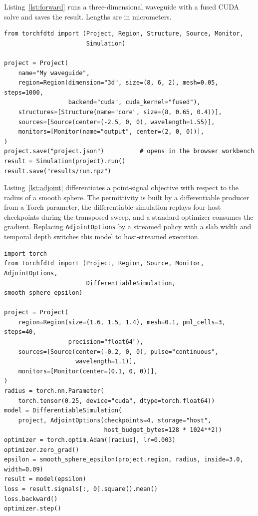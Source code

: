 \documentclass[11pt,a4paper]{article}
\newcommand{\code}[1]{{\small\nolinkurl{#1}}}
\begin{document}
Listing~\ref{lst:forward} runs a three-dimensional waveguide with a fused CUDA solve and saves the result. Lengths are in micrometers.
\begin{lstlisting}[float=tbp,caption={A forward simulation with the fused CUDA path.},label={lst:forward}]
from torchfdtd import (Project, Region, Structure, Source, Monitor,
                       Simulation)

project = Project(
    name="My waveguide",
    region=Region(dimension="3d", size=(8, 6, 2), mesh=0.05, steps=1000,
                  backend="cuda", cuda_kernel="fused"),
    structures=[Structure(name="core", size=(8, 0.65, 0.4))],
    sources=[Source(center=(-2.5, 0, 0), wavelength=1.55)],
    monitors=[Monitor(name="output", center=(2, 0, 0))],
)
project.save("project.json")          # opens in the browser workbench
result = Simulation(project).run()
result.save("results/run.npz")
\end{lstlisting}

Listing~\ref{lst:adjoint} differentiates a point-signal objective with respect to the radius of a smooth sphere. The permittivity is built by a differentiable producer from a Torch parameter, the differentiable simulation replays four host checkpoints during the transposed sweep, and a standard optimizer consumes the gradient. Replacing \code{AdjointOptions} by a streamed policy with a slab width and temporal depth switches this model to host-streamed execution.
\begin{lstlisting}[float=tbp,caption={A differentiable simulation with checkpoint replay.},label={lst:adjoint}]
import torch
from torchfdtd import (Project, Region, Source, Monitor, AdjointOptions,
                       DifferentiableSimulation, smooth_sphere_epsilon)

project = Project(
    region=Region(size=(1.6, 1.5, 1.4), mesh=0.1, pml_cells=3, steps=40,
                  precision="float64"),
    sources=[Source(center=(-0.2, 0, 0), pulse="continuous",
                    wavelength=1.1)],
    monitors=[Monitor(center=(0.1, 0, 0))],
)
radius = torch.nn.Parameter(
    torch.tensor(0.25, device="cuda", dtype=torch.float64))
model = DifferentiableSimulation(
    project, AdjointOptions(checkpoints=4, storage="host",
                            host_budget_bytes=128 * 1024**2))
optimizer = torch.optim.Adam([radius], lr=0.003)
optimizer.zero_grad()
epsilon = smooth_sphere_epsilon(project.region, radius, inside=3.0, width=0.09)
result = model(epsilon)
loss = result.signals[:, 0].square().mean()
loss.backward()
optimizer.step()
\end{lstlisting}
\end{document}
